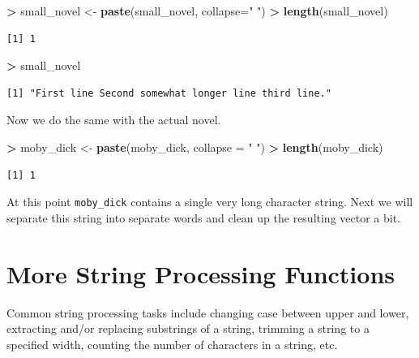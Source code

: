\documentclass[]{krantz}
\makeatletter
\newenvironment{Shaded}{\begin{snugshade}}{\end{snugshade}}
\newcommand{\KeywordTok}[1]{\textcolor[rgb]{0.27,0.27,0.27}{\textbf{#1}}}
\newcommand{\DataTypeTok}[1]{\textcolor[rgb]{0.27,0.27,0.27}{#1}}
\newcommand{\StringTok}[1]{\textcolor[rgb]{0.5,0.5,0.5}{#1}}
\newcommand{\OperatorTok}[1]{\textcolor[rgb]{0.43,0.43,0.43}{\textbf{#1}}}
\newcommand{\NormalTok}[1]{#1}
\newenvironment{kframe}{%
\medskip{}
\setlength{\fboxsep}{.8em}
 \def\at@end@of@kframe{}%
 \ifinner\ifhmode%
  \def\at@end@of@kframe{\end{minipage}}%
  \begin{minipage}{\columnwidth}%
 \fi\fi%
 \def\FrameCommand##1{\hskip\@totalleftmargin \hskip-\fboxsep
 \colorbox{shadecolor}{##1}\hskip-\fboxsep
     \hskip-\linewidth \hskip-\@totalleftmargin \hskip\columnwidth}%
 \MakeFramed {\advance\hsize-\width
   \@totalleftmargin\z@ \linewidth\hsize
   \@setminipage}}%
 {\par\unskip\endMakeFramed%
 \at@end@of@kframe}
\renewenvironment{Shaded}{\begin{kframe}}{\end{kframe}}
\makeatother
\begin{document}
\begin{Shaded}
\begin{Highlighting}[]
\OperatorTok{>}\StringTok{ }\NormalTok{small_novel <-}\StringTok{ }\KeywordTok{paste}\NormalTok{(small_novel, }\DataTypeTok{collapse=}\StringTok{" "}\NormalTok{)}
\OperatorTok{>}\StringTok{ }\KeywordTok{length}\NormalTok{(small_novel)}
\end{Highlighting}
\end{Shaded}

\begin{verbatim}
[1] 1
\end{verbatim}

\begin{Shaded}
\begin{Highlighting}[]
\OperatorTok{>}\StringTok{ }\NormalTok{small_novel}
\end{Highlighting}
\end{Shaded}

\begin{verbatim}
[1] "First line Second somewhat longer line third line."
\end{verbatim}

Now we do the same with the actual novel.

\begin{Shaded}
\begin{Highlighting}[]
\OperatorTok{>}\StringTok{ }\NormalTok{moby_dick <-}\StringTok{ }\KeywordTok{paste}\NormalTok{(moby_dick, }\DataTypeTok{collapse =} \StringTok{" "}\NormalTok{)}
\OperatorTok{>}\StringTok{ }\KeywordTok{length}\NormalTok{(moby_dick)}
\end{Highlighting}
\end{Shaded}

\begin{verbatim}
[1] 1
\end{verbatim}

At this point \texttt{moby\_dick} contains a single very long character
string. Next we will separate this string into separate words and clean
up the resulting vector a bit.

\section{More String Processing
Functions}\label{more-string-processing-functions}

Common string processing tasks include changing case between upper and
lower, extracting and/or replacing substrings of a string, trimming a
string to a specified width, counting the number of characters in a
string, etc.
\end{document}
